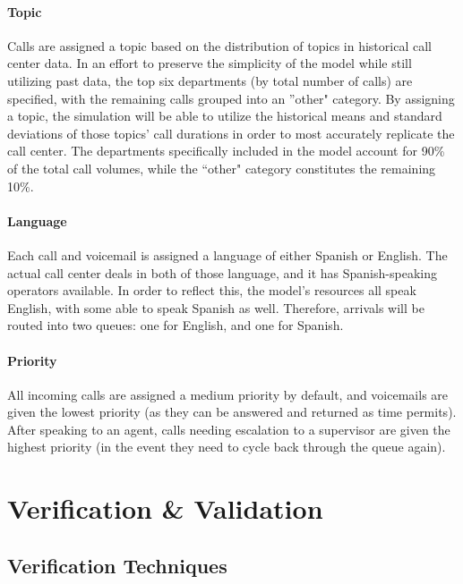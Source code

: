\documentclass[12pt,twocolumn]{article}
\begin{document}
\paragraph{Topic}

Calls are assigned a topic based on the distribution of topics in historical call center data.  In an effort to preserve the simplicity of the model while still utilizing past data, the top six departments (by total number of calls) are specified, with the remaining calls grouped into an ''other" category.  By assigning a topic, the simulation will be able to utilize the historical means and standard deviations of those topics' call durations in order to most accurately replicate the call center.  The departments specifically included in the model account for 90\% of the total call volumes, while the ``other" category constitutes the remaining 10\%.


\paragraph{Language}

Each call and voicemail is assigned a language of either Spanish or English.  The actual call center deals in both of those language, and it has Spanish-speaking operators available.  In order to reflect this, the model's resources all speak English, with some able to speak Spanish as well.  Therefore, arrivals will be routed into two queues:  one for English, and one for Spanish.

\paragraph{Priority}

All incoming calls are assigned a medium priority by default, and voicemails are given the lowest priority (as they can be answered and returned as time permits).  After speaking to an agent, calls needing escalation to a supervisor are given the highest priority (in the event they need to cycle back through the queue again).


\section{Verification \& Validation}

	\subsection{Verification Techniques}
	
\end{document}
